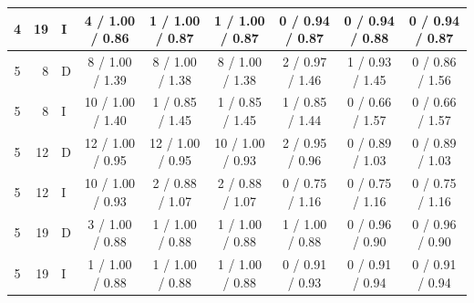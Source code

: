 \begin{tabular}{crlcccccc}
4 & 19 & I & 4 / 1.00 / 0.86 & 1 / 1.00 / 0.87 & 1 / 1.00 / 0.87 & 0 / 0.94 / 0.87 & 0 / 0.94 / 0.88 & 0 / 0.94 / 0.87 \\
\midrule
5 & 8 & D & 8 / 1.00 / 1.39 & 8 / 1.00 / 1.38 & 8 / 1.00 / 1.38 & 2 / 0.97 / 1.46 & 1 / 0.93 / 1.45 & 0 / 0.86 / 1.56 \\
5 & 8 & I & 10 / 1.00 / 1.40 & 1 / 0.85 / 1.45 & 1 / 0.85 / 1.45 & 1 / 0.85 / 1.44 & 0 / 0.66 / 1.57 & 0 / 0.66 / 1.57 \\
5 & 12 & D & 12 / 1.00 / 0.95 & 12 / 1.00 / 0.95 & 10 / 1.00 / 0.93 & 2 / 0.95 / 0.96 & 0 / 0.89 / 1.03 & 0 / 0.89 / 1.03 \\
5 & 12 & I & 10 / 1.00 / 0.93 & 2 / 0.88 / 1.07 & 2 / 0.88 / 1.07 & 0 / 0.75 / 1.16 & 0 / 0.75 / 1.16 & 0 / 0.75 / 1.16 \\
5 & 19 & D & 3 / 1.00 / 0.88 & 1 / 1.00 / 0.88 & 1 / 1.00 / 0.88 & 1 / 1.00 / 0.88 & 0 / 0.96 / 0.90 & 0 / 0.96 / 0.90 \\
5 & 19 & I & 1 / 1.00 / 0.88 & 1 / 1.00 / 0.88 & 1 / 1.00 / 0.88 & 0 / 0.91 / 0.93 & 0 / 0.91 / 0.94 & 0 / 0.91 / 0.94 \\
\bottomrule
\end{tabular}


